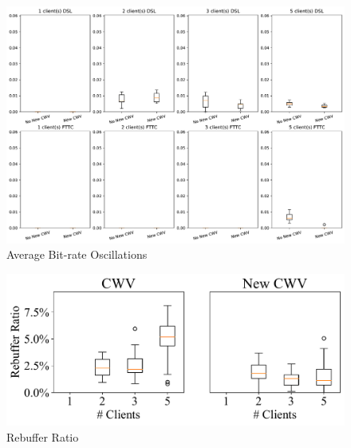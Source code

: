 \documentclass[10pt,sigconf]{acmart}
\begin{document}
\begin{figure}
  \centering
  \includegraphics[width=\textwidth]{figures/Average_Oscillations.pdf}
  \caption{Average Bit-rate Oscillations}
  \label{fig:avg-oscillations}
\end{figure}

\begin{figure}
  \centering
  \includegraphics[width=\textwidth]{figures/Rebuffer_ratio.pdf}
  \caption{Rebuffer Ratio}
  \label{fig:rebuffer-ratio}
\end{figure}


\end{document}
